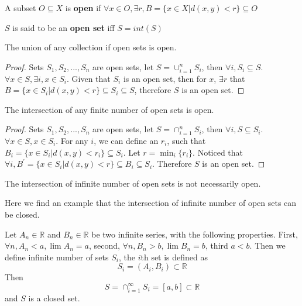 				\begin{definition}
					A subset $O \subseteq X$ is \textbf{open} if $\forall x \in O, \exists r, B=\{x\in X|d(x, y) < r\} \subseteq O$
				\end{definition}

				$S$ is said to be an \textbf{open set} iff $S=int(S)$

				\begin{theorem}
					The union of any collection if open sets is open.
				\end{theorem}

				\begin{proof}
					Sets $S_1, S_2, ..., S_n$ are open sets, let $S = \cup_{i=1}^n S_i$, then $\forall i, S_i \subseteq S$. $\forall x\in S, \exists i, x\in S_i$. Given that $S_i$ is an open set, then for $x$, $\exists r$ that $B = \{x \in S_i | d(x, y) < r\} \subseteq S_i \subseteq S$, therefore $S$ is an open set.
				\end{proof}

				\begin{theorem}
					The intersection of any finite number of open sets is open.
				\end{theorem}

				\begin{proof}
					Sets $S_1, S_2, ..., S_n$ are open sets, let $S = \cap_{i=1}^n S_i$, then $\forall i, S \subseteq S_i$. $\forall x\in S, x\in S_i$. For any $i$, we can define an $r_i$, such that $B_i = \{x\in S_i|d(x, y) < r_i\} \subseteq S_i$. Let $r = \min_i\{r_i\}$. Noticed that $\forall i, B^\prime = \{x \in S_i|d(x, y) < r\} \subseteq B_i \subseteq S_i$. Therefore $S$ is an open set.
				\end{proof}

				\begin{remark}
					The intersection of infinite number of open sets is not necessarily open.
				\end{remark}

				Here we find an example that the intersection of infinite number of open sets can be closed.
				\begin{example}
					Let $A_n \in \mathbb{R}$ and $B_n \in \mathbb{R}$ be two infinite series, with the following properties. First, $\forall n, A_n < a, \lim A_n = a$, second, $\forall n, B_n > b, \lim B_n = b$, third $a < b$. Then we define infinite number of sets $S_i$, the $i$th set is defined as
					\begin{equation}
						S_i = (A_i, B_i) \subset \mathbb{R}
					\end{equation}
					Then
					\begin{equation}
						S = \cap_{i=1}^\infty S_i = [a, b] \subset \mathbb{R}
					\end{equation}
					and $S$ is a closed set.
				\end{example}

